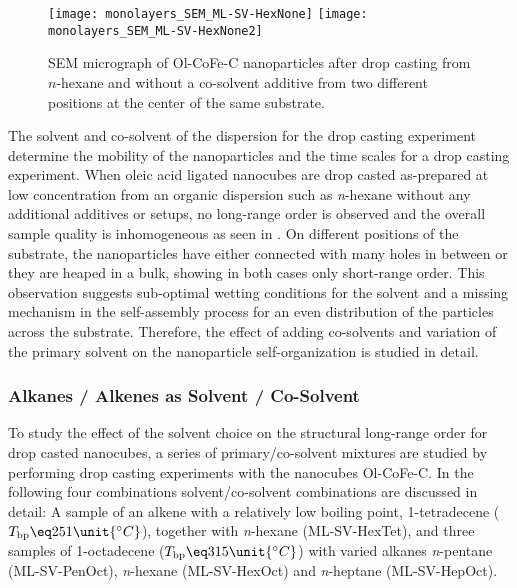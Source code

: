 \documentclass[\main/dresen_thesis.tex]{subfiles}
\begin{document}
  \label{sec:monolayers:preparation:solventProperties}
  \begin{figure}[tb]
    \centering
    \texttt{[image: monolayers\_SEM\_ML-SV-HexNone]}
    \texttt{[image: monolayers\_SEM\_ML-SV-HexNone2]}
    \caption{\label{fig:monolayers:preparation:solventVariation:semNoCoSolvent}SEM micrograph of Ol-CoFe-C nanoparticles after drop casting from $\mathit{n}$-hexane and without a co-solvent additive from two different positions at the center of the same substrate.}
  \end{figure}
  The solvent and co-solvent of the dispersion for the drop casting experiment determine the mobility of the nanoparticles and the time scales for a drop casting experiment.
  When oleic acid ligated nanocubes are drop casted as-prepared at low concentration from an organic dispersion such as \textit{n}-hexane without any additional additives or setups, no long-range order is observed and the overall sample quality is inhomogeneous as seen in .
  On different positions of the substrate, the nanoparticles have either connected with many holes in between or they are heaped in a bulk, showing in both cases only short-range order.
  This observation suggests sub-optimal wetting conditions for the solvent and a missing mechanism in the self-assembly process for an even distribution of the particles across the substrate.
  Therefore, the effect of adding co-solvents and variation of the primary solvent on the nanoparticle self-organization is studied in detail.

  \subsubsection{Alkanes / Alkenes as Solvent / Co-Solvent}
    To study the effect of the solvent choice on the structural long-range order for drop casted nanocubes, a series of  primary/co-solvent mixtures are studied by performing drop casting experiments with the nanocubes Ol-CoFe-C.
    In the following four combinations solvent/co-solvent combinations are discussed in detail: A sample of an alkene with a relatively low boiling point, 1-tetradecene ($T_\mathrm{bp} \eq 251 \unit{^\circ C}$), together with \textit{n}-hexane (ML-SV-HexTet), and three samples of 1-octadecene ($T_\mathrm{bp} \eq 315 \unit{^\circ C}$) with varied alkanes \textit{n}-pentane (ML-SV-PenOct), \textit{n}-hexane (ML-SV-HexOct) and \textit{n}-heptane (ML-SV-HepOct).
\end{document}
